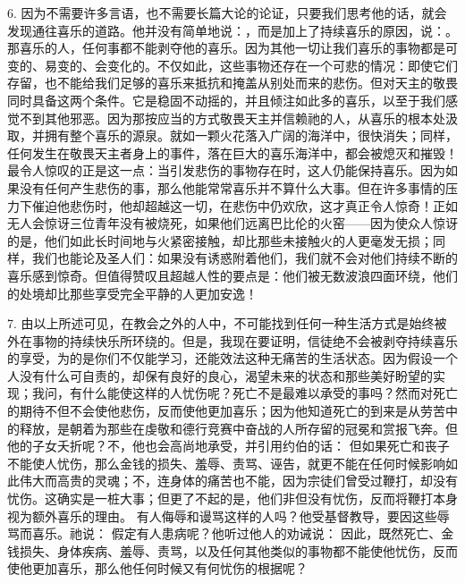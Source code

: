 6. 因为不需要许多言语，也不需要长篇大论的论证，只要我们思考他的话，就会发现通往喜乐的道路。他并没有简单地说：，而是加上了持续喜乐的原因，说：。那喜乐的人，任何事都不能剥夺他的喜乐。因为其他一切让我们喜乐的事物都是可变的、易变的、会变化的。不仅如此，这些事物还存在一个可悲的情况：即使它们存留，也不能给我们足够的喜乐来抵抗和掩盖从别处而来的悲伤。但对天主的敬畏同时具备这两个条件。它是稳固不动摇的，并且倾注如此多的喜乐，以至于我们感觉不到其他邪恶。因为那按应当的方式敬畏天主并信赖祂的人，从喜乐的根本处汲取，并拥有整个喜乐的源泉。就如一颗火花落入广阔的海洋中，很快消失；同样，任何发生在敬畏天主者身上的事件，落在巨大的喜乐海洋中，都会被熄灭和摧毁！最令人惊叹的正是这一点：当引发悲伤的事物存在时，这人仍能保持喜乐。因为如果没有任何产生悲伤的事，那么他能常常喜乐并不算什么大事。但在许多事情的压力下催迫他悲伤时，他却超越这一切，在悲伤中仍欢欣，这才真正令人惊奇！正如无人会惊讶三位青年没有被烧死，如果他们远离巴比伦的火窑——因为使众人惊讶的是，他们如此长时间地与火紧密接触，却比那些未接触火的人更毫发无损；同样，我们也能论及圣人们：如果没有诱惑附着他们，我们就不会对他们持续不断的喜乐感到惊奇。但值得赞叹且超越人性的要点是：他们被无数波浪四面环绕，他们的处境却比那些享受完全平静的人更加安逸！\par

7. 由以上所述可见，在教会之外的人中，不可能找到任何一种生活方式是始终被外在事物的持续快乐所环绕的。但是，我现在要证明，信徒绝不会被剥夺持续喜乐的享受，为的是你们不仅能学习，还能效法这种无痛苦的生活状态。因为假设一个人没有什么可自责的，却保有良好的良心，渴望未来的状态和那些美好盼望的实现；我问，有什么能使这样的人忧伤呢？死亡不是最难以承受的事吗？然而对死亡的期待不但不会使他悲伤，反而使他更加喜乐；因为他知道死亡的到来是从劳苦中的释放，是朝着为那些在虔敬和德行竞赛中奋战的人所存留的冠冕和赏报飞奔。但他的子女夭折呢？不，他也会高尚地承受，并引用约伯的话： 但如果死亡和丧子不能使人忧伤，那么金钱的损失、羞辱、责骂、诬告，就更不能在任何时候影响如此伟大而高贵的灵魂；不，连身体的痛苦也不能，因为宗徒们曾受过鞭打，却没有忧伤。这确实是一桩大事；但更了不起的是，他们非但没有忧伤，反而将鞭打本身视为额外喜乐的理由。 有人侮辱和谩骂这样的人吗？他受基督教导，要因这些辱骂而喜乐。祂说： 假定有人患病呢？他听过他人的劝诫说： 因此，既然死亡、金钱损失、身体疾病、羞辱、责骂，以及任何其他类似的事物都不能使他忧伤，反而使他更加喜乐，那么他任何时候又有何忧伤的根据呢？\par

